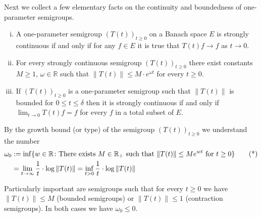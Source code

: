 Next we collect a few elementary facts on the continuity and boundedness of one-parameter semigroups.
\begin{remark}
\begin{enumerate}[(i)]
\item
A one-parameter semigroup $(T(t))_{t \geq 0}$ on a Banach space $E$ is strongly continuous if and only if for any $f \in E$ it is true that $T(t)f \to f$ as $t \to 0$.

\item
For every strongly continuous semigroup $(T(t))_{t \geq 0}$ there exist constants $M \geq 1$, $\omega \in \mathbb{R}$ such that $\|T(t)\| \leq M \cdot e^{\omega t}$ for every $t \geq 0$.

\item
If $(T(t))_{t \geq 0}$ is a one-parameter semigroup such that $\|T(t)\|$ is bounded for $0 \leq t \leq \delta$ then it is strongly continuous if and only if $\lim_{t \to 0} T(t)f = f$ for every $f$ in a total subset of $E$.

\end{enumerate}
\end{remark}
\begin{definition}
By the growth bound (or type) of the semigroup $(T(t))_{t \geq 0}$ we understand the number
\begin{align*}
\omega_{0} &:= \inf\{w \in \mathbb{R} \colon \text{There exists $ M \in \mathbb{R}_{+}$ such that $\|T(t)\| \leq M e^{wt}$ 
	for $t \geq 0$} \} \tag{*}\\
&= \lim_{t \to \infty} \frac{1}{t} \cdot \log\|T(t)\| = \inf_{t > 0} \frac{1}{t} \cdot \log\|T(t)\|
\end{align*}
\end{definition}
Particularly important are semigroups such that for every $t \geq 0$ we have $\|T(t)\| \leq M$ (bounded semigroups) or $\|T(t)\| \leq 1$ (contraction semigroups).
In both cases we have $\omega_{0} \leq 0$.

